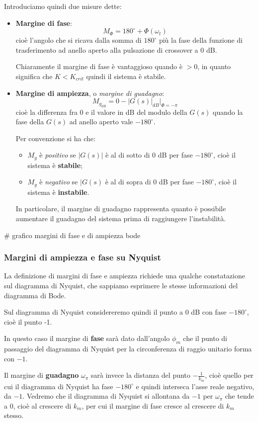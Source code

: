 \documentclass[a4paper,11pt]{article}
\begin{document}
Introduciamo quindi due misure dette:
\begin{itemize}
	\item \textbf{Margine di fase}:
		$$
			M_\Phi = 180^\circ + \Phi(\omega_t)
		$$
		cioè l'angolo che si ricava dalla somma di $180^\circ$ più la fase della funzione di trasferimento ad anello aperto alla pulsazione di crossover a 0 dB.

		Chiaramente il margine di fase è vantaggioso quando è $> 0$, in quanto significa che $K < K_{crit}$  quindi il sistema è stabile.
	\item \textbf{Margine di ampiezza}, o \textit{margine di guadagno}:
		$$
			M_{g_{dB}} = 0 - |G(s)|_{dB} \big|_{\Phi = - \pi}
		$$
		cioè la differenza fra 0 e il valore in dB del modulo della $G(s)$ quando la fase della $G(s)$ ad anello aperto vale $-180^\circ$.

		Per convenzione si ha che:
		\begin{itemize}
			\item $M_g$ è \textit{positivo} se $|G(s)|$ è al di sotto di 0 dB per fase $-180^\circ$, cioè il sistema è \textbf{stabile};
			\item $M_g$ è \textit{negativo} se $|G(s)$ è al di sopra di 0 dB per fase $-180^\circ$, cioè il sistema è \textbf{instabile}.
		\end{itemize}

	In particolare, il margine di guadagno rappresenta quanto è possibile aumentare il guadagno del sistema prima di raggiungere l'instabilità.
\end{itemize}

# grafico margini di fase e di ampiezza bode 

\subsubsection{Margini di ampiezza e fase su Nyquist}
La definizione di margini di fase e ampiezza richiede una qualche constatazione sul diagramma di Nyquist, che sappiamo esprimere le stesse informazioni del diagramma di Bode.

Sul diagramma di Nyquist considereremo quindi il punto a 0 dB con fase $-180^\circ$, cioè il punto -1.

In questo caso il margine di \textbf{fase} sarà dato dall'angolo $\phi_m$ che il punto di passaggio del diagramma di Nyquist per la circonferenza di raggio unitario forma con $-1$.

Il margine di \textbf{guadagno} $\omega_\pi$ sarà invece la distanza del punto $-\frac{1}{k_m}$, cioè quello per cui il diagramma di Nyquist ha fase $-180^\circ$ e quindi interseca l'asse reale negativo, da $-1$.
Vedremo che il diagramma di Nyquist si allontana da $-1$ per $\omega_\pi$ che tende a 0, cioè al crescere di $k_m$, per cui il margine di fase cresce al crescere di $k_m$ stesso.
\end{document}
